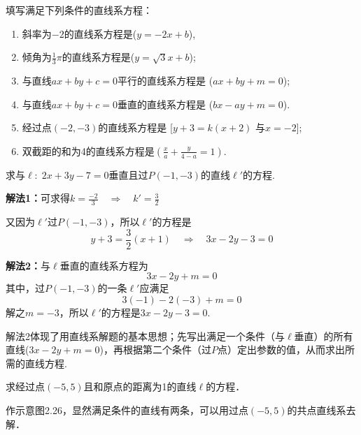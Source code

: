 \begin{example}
填写满足下列条件的直线系方程：
\begin{enumerate}[(1)]
\item 斜率为$-2$的直线系方程是($y=-2x+b$),
\item 倾角为$\frac{1}{3}\pi$的直线系方程是($y=\sqrt{3}x+b$);
\item 与直线$ax+by+c=0$平行的直线系方程是
($ax+by+m=0$);
\item 与直线$ax+by+c=0$垂直的直线系方程是
($bx-ay+m=0$).
\item 经过点$(-2,-3)$的直线系方程是
[$y+3=k(x+2)$ 与$x=-2$];
\item 双截距的和为4的直线系方程是$\left(\frac{x}{a}+\frac{y}{4-a}=1\right)$.
\end{enumerate}
\end{example}

\begin{example}
     求与$\ell:\; 2x+3y-7=0$垂直且过$P(-1,-3)$的直线$\ell'$的方程.
\end{example}

\begin{solution}
    \textbf{解法1：}可求得$k=\frac{-2}{3}\quad \Rightarrow\quad k'=\frac{3}{2}$
    
    又因为$\ell'$过$P(-1,-3)$，所以$\ell'$的方程是
\[y+3=\frac{3}{2}(x+1)\quad \Rightarrow\quad 3x-2y-3=0\]

\textbf{解法2：}与$\ell$垂直的直线系方程为
\[3x-2y+m=0\]
其中，过$P(-1,-3)$的一条$\ell'$应满足
\[3(-1)-2(-3)+m=0\]
解之$m=-3$，所以$\ell'$的方程是$3x-2y-3=0$.
\end{solution}

\begin{remark}
    解法2体现了用直线系解题的基本思想；先写出满足一个条件（与$\ell$垂直）的所有直线($3x-2y+m=0$)，再根据第二个条件（过$P$点）定出参数的值，从而求出所需的直线方程.
\end{remark}

\begin{example}
    求经过点$(-5,5)$且和原点的距离为1的直线$\ell$的方程．
\end{example}

\begin{analyze}
 作示意图2.26，显然满足条件的直线有两条，可以用过点$(-5,5)$的共点直线系去解．
\end{analyze}

